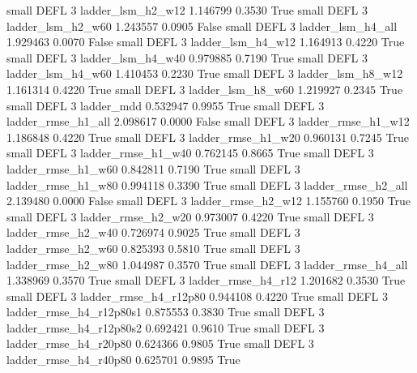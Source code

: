      small     DEFL                 3        ladder_lsm_h2_w12   1.146799      0.3530    True
     small     DEFL                 3        ladder_lsm_h2_w60   1.243557      0.0905   False
     small     DEFL                 3        ladder_lsm_h4_all   1.929463      0.0070   False
     small     DEFL                 3        ladder_lsm_h4_w12   1.164913      0.4220    True
     small     DEFL                 3        ladder_lsm_h4_w40   0.979885      0.7190    True
     small     DEFL                 3        ladder_lsm_h4_w60   1.410453      0.2230    True
     small     DEFL                 3        ladder_lsm_h8_w12   1.161314      0.4220    True
     small     DEFL                 3        ladder_lsm_h8_w60   1.219927      0.2345    True
     small     DEFL                 3               ladder_mdd   0.532947      0.9955    True
     small     DEFL                 3       ladder_rmse_h1_all   2.098617      0.0000   False
     small     DEFL                 3       ladder_rmse_h1_w12   1.186848      0.4220    True
     small     DEFL                 3       ladder_rmse_h1_w20   0.960131      0.7245    True
     small     DEFL                 3       ladder_rmse_h1_w40   0.762145      0.8665    True
     small     DEFL                 3       ladder_rmse_h1_w60   0.842811      0.7190    True
     small     DEFL                 3       ladder_rmse_h1_w80   0.994118      0.3390    True
     small     DEFL                 3       ladder_rmse_h2_all   2.139480      0.0000   False
     small     DEFL                 3       ladder_rmse_h2_w12   1.155760      0.1950    True
     small     DEFL                 3       ladder_rmse_h2_w20   0.973007      0.4220    True
     small     DEFL                 3       ladder_rmse_h2_w40   0.726974      0.9025    True
     small     DEFL                 3       ladder_rmse_h2_w60   0.825393      0.5810    True
     small     DEFL                 3       ladder_rmse_h2_w80   1.044987      0.3570    True
     small     DEFL                 3       ladder_rmse_h4_all   1.338969      0.3570    True
     small     DEFL                 3       ladder_rmse_h4_r12   1.201682      0.3530    True
     small     DEFL                 3    ladder_rmse_h4_r12p80   0.944108      0.4220    True
     small     DEFL                 3  ladder_rmse_h4_r12p80s1   0.875553      0.3830    True
     small     DEFL                 3  ladder_rmse_h4_r12p80s2   0.692421      0.9610    True
     small     DEFL                 3    ladder_rmse_h4_r20p80   0.624366      0.9805    True
     small     DEFL                 3    ladder_rmse_h4_r40p80   0.625701      0.9895    True
